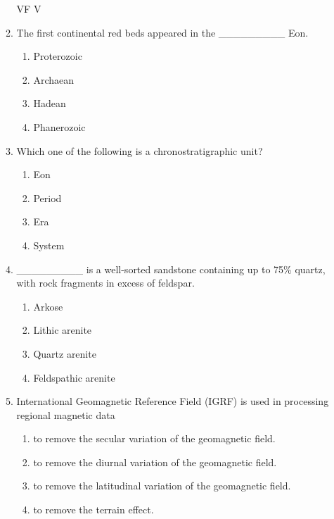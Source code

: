 \documentclass[journal,12pt,onecolumn]{IEEEtran}
\begin{document}
\begin{enumerate}
\begin{enumerate} VF V 

\item The first continental red beds appeared in the \_\_\_\_\_\_\_\_\_ Eon.

\hfill{}

\begin{multicols}{4}
\begin{enumerate}
\item Proterozoic
\item Archaean
\item Hadean
\item Phanerozoic
\end{enumerate}
\end{multicols}

\item Which one of the following is a chronostratigraphic unit?

\hfill{}

\begin{multicols}{4}
\begin{enumerate}
\item Eon
\item Period
\item Era
\item System
\end{enumerate}
\end{multicols}

\item \_\_\_\_\_\_\_\_\_ is a well-sorted sandstone containing up to 75\% quartz, with rock fragments in excess of feldspar.

\hfill{}

\begin{multicols}{4}
\begin{enumerate}
\item Arkose
\item Lithic arenite
\item Quartz arenite
\item Feldspathic arenite
\end{enumerate}
\end{multicols}

\item International Geomagnetic Reference Field (IGRF) is used in processing regional magnetic data

\hfill{}

\begin{multicols}{2}
\begin{enumerate}
\item to remove the secular variation of the geomagnetic field.
\item to remove the diurnal variation of the geomagnetic field.
\item to remove the latitudinal variation of the geomagnetic field.
\item to remove the terrain effect.
\end{enumerate}
\end{multicols}


\end{enumerate}
\end{enumerate}
\end{document}
